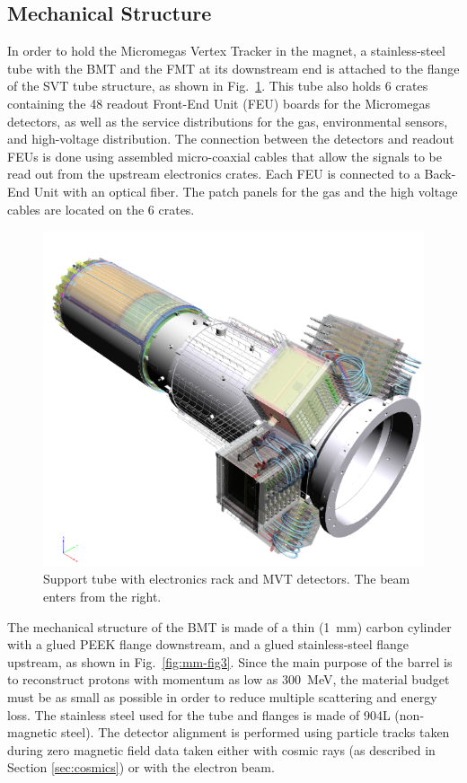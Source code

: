 \subsection{Mechanical Structure}

In order to hold the Micromegas Vertex Tracker in the magnet, a stainless-steel tube with the BMT and the FMT at its
downstream end is attached to the flange of the SVT tube structure, as shown in Fig.~\ref{fig:mm-fig2}. This tube also
holds 6 crates containing the 48 readout Front-End Unit (FEU) boards for the Micromegas detectors, as well as the service
distributions for the gas, environmental sensors, and high-voltage distribution. The connection between the detectors and
readout FEUs is done using assembled micro-coaxial cables that allow the signals to be read out from the upstream
electronics crates. Each FEU is connected to a Back-End Unit with an optical fiber. The patch panels for the gas and the high
voltage cables are located on the 6 crates.

\begin{figure}[htb]
 \includegraphics[width=1.0\columnwidth,keepaspectratio]{images/fig2}
 \caption{Support tube with electronics rack and MVT detectors. The beam enters from the right.}
 \label{fig:mm-fig2}
\end{figure}

The mechanical structure of the BMT is made of a thin (1~mm) carbon cylinder with a glued PEEK flange downstream, and a
glued stainless-steel flange upstream, as shown in Fig.~\ref{fig:mm-fig3}. Since the main purpose of the barrel is to
reconstruct protons with momentum as low as 300~MeV, the material budget must be as small as possible in order to reduce
multiple scattering and energy loss. The stainless steel used for the tube and flanges is made of 904L (non-magnetic steel).
The detector alignment is performed using particle tracks taken during zero magnetic field data taken either with cosmic
rays (as described in Section \ref{sec:cosmics}) or with the electron beam.

